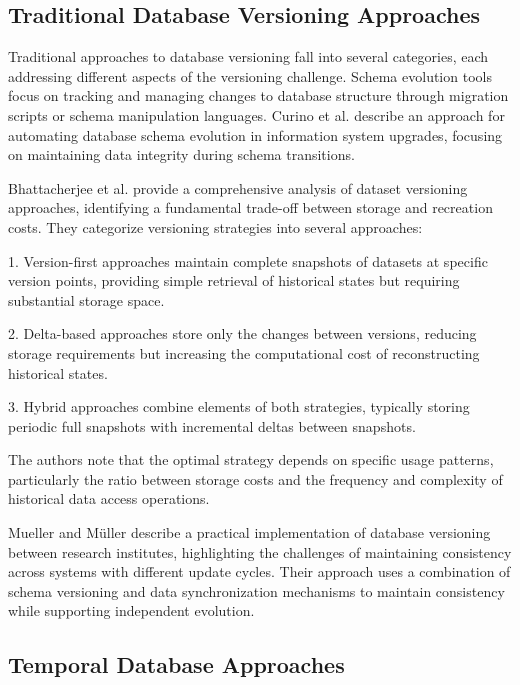 \subsection{Traditional Database Versioning Approaches}
\label{subsec:traditional-database-versioning}

Traditional approaches to database versioning fall into several categories, each addressing different aspects of the versioning challenge. Schema evolution tools focus on tracking and managing changes to database structure through migration scripts or schema manipulation languages. Curino et al. \cite{curino2009automating} describe an approach for automating database schema evolution in information system upgrades, focusing on maintaining data integrity during schema transitions.

Bhattacherjee et al. \cite{bhattacherjee2015principles} provide a comprehensive analysis of dataset versioning approaches, identifying a fundamental trade-off between storage and recreation costs. They categorize versioning strategies into several approaches:

1. Version-first approaches maintain complete snapshots of datasets at specific version points, providing simple retrieval of historical states but requiring substantial storage space.

2. Delta-based approaches store only the changes between versions, reducing storage requirements but increasing the computational cost of reconstructing historical states.

3. Hybrid approaches combine elements of both strategies, typically storing periodic full snapshots with incremental deltas between snapshots.

The authors note that the optimal strategy depends on specific usage patterns, particularly the ratio between storage costs and the frequency and complexity of historical data access operations.

Mueller and Müller \cite{mueller2018conception} describe a practical implementation of database versioning between research institutes, highlighting the challenges of maintaining consistency across systems with different update cycles. Their approach uses a combination of schema versioning and data synchronization mechanisms to maintain consistency while supporting independent evolution.

\subsection{Temporal Database Approaches}
\label{subsec:temporal-database-approaches}

